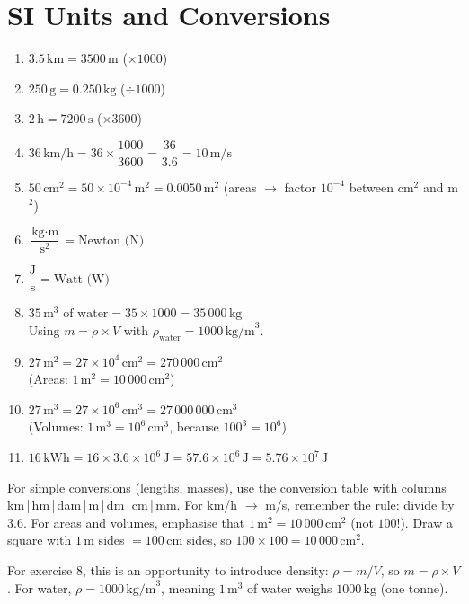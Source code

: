 \documentclass[11pt,a4paper]{article}
\newcommand{\corrbox}[1]{
\begin{tcolorbox}[colback=correctgreen!8!white,colframe=correctgreen!60!black]
#1
\end{tcolorbox}
}
\newcommand{\tipbox}[1]{
\begin{tcolorbox}[colback=tipblue!8!white,colframe=tipblue!60!black,title=\textbf{How to explain}]
#1
\end{tcolorbox}
}
\begin{document}
\section{SI Units and Conversions}

\corrbox{
\begin{enumerate}
\item $3.5\,\text{km} = 3500\,\text{m}$ \quad ($\times 1000$)
\item $250\,\text{g} = 0.250\,\text{kg}$ \quad ($\div 1000$)
\item $2\,\text{h} = 7200\,\text{s}$ \quad ($\times 3600$)
\item $36\,\text{km/h} = 36 \times \dfrac{1000}{3600} = \dfrac{36}{3.6} = 10\,\text{m/s}$
\item $50\,\text{cm}^{2} = 50 \times 10^{-4}\,\text{m}^{2} = 0.0050\,\text{m}^{2}$ \quad (areas $\rightarrow$ factor $10^{-4}$ between cm$^{2}$ and m$^{2}$)
\item $\dfrac{\text{kg} \cdot \text{m}}{\text{s}^{2}} = \text{Newton (N)}$
\item $\dfrac{\text{J}}{\text{s}} = \text{Watt (W)}$
\item $35\,\text{m}^{3} \text{ of water} = 35 \times 1000 = 35\,000\,\text{kg}$\\[0.1cm]
Using $m = \rho \times V$ with $\rho_{\text{water}} = 1000\,\text{kg/m}^{3}$.
\item $27\,\text{m}^{2} = 27 \times 10^{4}\,\text{cm}^{2} = 270\,000\,\text{cm}^{2}$\\[0.1cm]
(Areas: $1\,\text{m}^{2} = 10\,000\,\text{cm}^{2}$)
\item $27\,\text{m}^{3} = 27 \times 10^{6}\,\text{cm}^{3} = 27\,000\,000\,\text{cm}^{3}$\\[0.1cm]
(Volumes: $1\,\text{m}^{3} = 10^{6}\,\text{cm}^{3}$, because $100^{3} = 10^{6}$)
\item $16\,\text{kWh} = 16 \times 3.6 \times 10^{6}\,\text{J} = 57.6 \times 10^{6}\,\text{J} = 5.76 \times 10^{7}\,\text{J}$
\end{enumerate}
}

\tipbox{
For simple conversions (lengths, masses), use the conversion table with columns km\,|\,hm\,|\,dam\,|\,m\,|\,dm\,|\,cm\,|\,mm. For km/h $\rightarrow$ m/s, remember the rule: divide by $3.6$. For areas and volumes, emphasise that $1\,\text{m}^{2} = 10\,000\,\text{cm}^{2}$ (not $100$!). Draw a square with $1\,\text{m}$ sides $= 100\,\text{cm}$ sides, so $100 \times 100 = 10\,000\,\text{cm}^{2}$.

\vspace{0.2cm}
For exercise 8, this is an opportunity to introduce density: $\rho = m/V$, so $m = \rho \times V$. For water, $\rho = 1000\,\text{kg/m}^{3}$, meaning $1\,\text{m}^{3}$ of water weighs $1000\,\text{kg}$ (one tonne).
}
\end{document}
